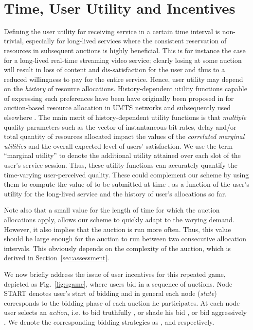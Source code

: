\documentclass[a4paper]{article}
\begin{document}
\\


\section{Time, User Utility and Incentives}\label{sec:time}

Defining the user utility for receiving service in
a certain time interval is non-trivial, especially for
long-lived services where the consistent reservation of resources in 
subsequent auctions is highly beneficial. This is for instance the case
for a long-lived real-time streaming video service; clearly losing at some 
auction will result in loss of content and dis-satisfaction for the user
and thus to a reduced willingness to pay for the entire service.
Hence, user utility may depend on the {\em history} of resource allocations. 
History-dependent utility functions capable of expressing such preferences
have been have originally been 
proposed in \cite{ATHENA} for auction-based resource allocation in UMTS networks 
and subsequently used elsewhere \cite{HERA, Bruno}. 
The main merit of history-dependent utility functions is
that {\em multiple} quality parameters such as the vector of instantaneous
bit rates, delay and/or total quantity of resources
allocated impact the values of the {\em correlated marginal utilities}
and the overall expected level of users' satisfaction.
We use the term ``marginal utility'' to denote the 
additional utility attained over each slot of the user's service session.
Thus, these utility functions can accurately quantify the
time-varying user-perceived quality.
These could complement
our scheme by using them to compute the value of  
to be submitted at time , as a function of the user's utility
for the long-lived service and the history of user's allocations so far.


Note also that a small value for the length of time for which the 
auction allocations apply, allows our scheme to quickly
adapt to the varying demand. However, it also implies that 
the auction is run more often. Thus, this value
should be large enough for the auction to run between two consecutive allocation 
intervals. This obviously depends on the complexity of the auction,
which is derived in Section~\ref{sec:assessment}.

We now briefly address the issue of user incentives for this repeated game,
depicted as Fig.~\ref{fig:sgame}, where users bid in a sequence of auctions. 
Node START denotes user's  start of bidding and in general each node 
({\em state}) corresponds to the bidding phase of each auction he participates. 
At each node user  selects an {\em action}, i.e. to bid truthfully
, or shade his bid , or bid aggressively .
We denote the corresponding bidding strategies as ,  and 
respectively.
\end{document}
